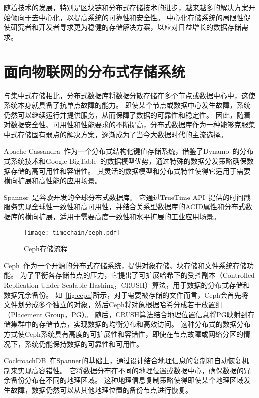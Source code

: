 随着技术的发展，特别是区块链和分布式存储技术的进步，越来越多的解决方案开始倾向于去中心化，以提高系统的可靠性和安全性。
中心化存储系统的局限性促使研究者和开发者寻求更为稳健的存储解决方案，以应对日益增长的数据存储需求。

\section{面向物联网的分布式存储系统}
与集中式存储相比，分布式数据库将数据分散存储在多个节点或数据中心中，这使系统本身就具备了抗单点故障的能力。
即使某个节点或数据中心发生故障，系统仍然可以继续运行并提供服务，从而保障了数据的可靠性和稳定性。
因此，随着对数据安全性、可用性和性能要求的不断提高，分布式数据库作为一种能够克服集中式存储固有弱点的解决方案，逐渐成为了当今大数据时代的主流选择。

Apache Cassandra~\cite{lakshman2010cassandra}作为一个分布式结构化键值存储系统，借鉴了Dynamo~\cite{decandia2007dynamo}的分布式系统技术和Google BigTable~\cite{chang2008bigtable}的数据模型优势，通过特殊的数据分发策略确保数据存储的高可用性和容错性。
其灵活的数据模型和分布式特性使得它适用于需要横向扩展和高性能的应用场景。

Spanner~\cite{corbett2013spanner}是谷歌开发的全球分布式数据库。
它通过TrueTime API~\cite{cervin2016truetime}提供的时间戳服务实现全球性一致性和高可用性，并结合关系型数据库的ACID属性和分布式数据库的横向扩展，适用于需要高度一致性和水平扩展的工业应用场景。

\begin{figure}[t]
    \centering
    \texttt{[image: timechain/ceph.pdf]}
    \caption{Ceph存储流程}
    \label{fig:ceph}
\end{figure}

Ceph~\cite{weil2006ceph}作为一个开源的分布式存储系统，提供对象存储、块存储和文件系统存储功能。
为了平衡各存储节点的压力，它提出了可扩展哈希下的受控副本（Controlled Replication Under Scalable Hashing，CRUSH）算法，用于数据的分布式存储和数据冗余备份。
如~\autoref{fig:ceph}所示，对于需要被存储的文件而言，Ceph会首先将文件划分成多个独立的对象，然后Ceph将对象根据哈希分成若干放置组（Placement Group，PG）。
随后，CRUSH算法结合地理位置信息将PG映射到存储集群中的存储节点，实现数据的均衡分布和高效访问。
这种分布式的数据分布方式使Ceph系统具有高度的可扩展性和容错性，即使在节点故障或网络分区的情况下，系统仍能保持数据的可靠性和可用性。

CockroachDB~\cite{taft2020cockroachdb}在Spanner的基础上，通过设计结合地理信息的复制和自动恢复机制来实现高容错性。
它将数据分布在不同的地理位置或数据中心，确保数据的冗余备份分布在不同的地理区域。
这种地理信息复制策略使得即使某个地理区域发生故障，数据仍然可以从其他地理位置的备份节点进行恢复。

